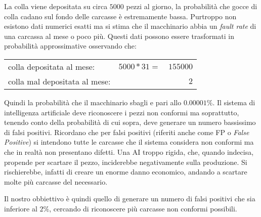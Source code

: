 La colla viene depositata su circa $5000$ pezzi al giorno, la probabilità che gocce di colla cadano sul fondo delle carcasse è estremamente bassa.
Purtroppo non esistono dati numerici esatti ma si stima che il macchinario abbia un \textit{fault rate} di una carcassa al mese o poco più.
Questi dati possono essere trasformati in probabilità approssimative osservando che:

\begin{center}
  \begin{tabular}{ l c r }
    colla depositata al mese: & $5000 * 31 =$& $155000$ \\
    colla mal depositata al mese: && $2$
  \end{tabular}
\end{center}
Quindi la probabilità che il macchinario sbagli e pari allo $0.00001\%$.
Il sistema di intelligenza artificiale deve riconoscere i pezzi non conformi ma soprattutto, tenendo conto della probabilità di cui sopra, deve generare un numero bassissimo di falsi positivi.
Ricordano che per falsi positivi (riferiti anche come FP o \textit{False Positive}) si intendono tutte le carcasse che il sistema considera non conformi ma che in realtà non presentano difetti.
Una AI troppo rigida, che, quando indecisa, propende per scartare il pezzo, inciderebbe negativamente sulla produzione.
Si rischierebbe, infatti di creare un enorme danno economico, andando a scartare molte più carcasse del necessario.

Il nostro obbiettivo è quindi quello di generare un numero di falsi positivi che sia inferiore al $2\%$, cercando di riconoscere più carcasse non conformi possibili.




